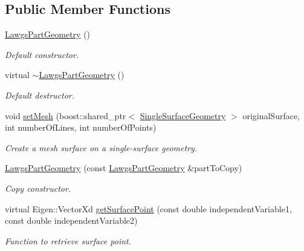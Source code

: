 \subsection*{Public Member Functions}
\begin{DoxyCompactItemize}
\item 
\hyperlink{classtudat_1_1geometric__shapes_1_1LawgsPartGeometry_ad94fc244be9691996b9ee1703b66925d}{Lawgs\+Part\+Geometry} ()
\begin{DoxyCompactList}\small\item\em Default constructor. \end{DoxyCompactList}\item 
virtual \hyperlink{classtudat_1_1geometric__shapes_1_1LawgsPartGeometry_aab069c9b07682f09943011c3a653113c}{$\sim$\+Lawgs\+Part\+Geometry} ()
\begin{DoxyCompactList}\small\item\em Default destructor. \end{DoxyCompactList}\item 
void \hyperlink{classtudat_1_1geometric__shapes_1_1LawgsPartGeometry_afa3ac8b84737b41184c9af54e49c8933}{set\+Mesh} (boost\+::shared\+\_\+ptr$<$ \hyperlink{classtudat_1_1geometric__shapes_1_1SingleSurfaceGeometry}{Single\+Surface\+Geometry} $>$ original\+Surface, int number\+Of\+Lines, int number\+Of\+Points)
\begin{DoxyCompactList}\small\item\em Create a mesh surface on a single-\/surface geometry. \end{DoxyCompactList}\item 
\hyperlink{classtudat_1_1geometric__shapes_1_1LawgsPartGeometry_a2cd980840078ea65ecad3d6768c8b82d}{Lawgs\+Part\+Geometry} (const \hyperlink{classtudat_1_1geometric__shapes_1_1LawgsPartGeometry}{Lawgs\+Part\+Geometry} \&part\+To\+Copy)
\begin{DoxyCompactList}\small\item\em Copy constructor. \end{DoxyCompactList}\item 
virtual Eigen\+::\+Vector\+Xd \hyperlink{classtudat_1_1geometric__shapes_1_1LawgsPartGeometry_a7076f2fc68b8df7032c191805a41ac57}{get\+Surface\+Point} (const double independent\+Variable1, const double independent\+Variable2)
\begin{DoxyCompactList}\small\item\em Function to retrieve surface point. \end{DoxyCompactList}\item 

\end{DoxyCompactItemize}
